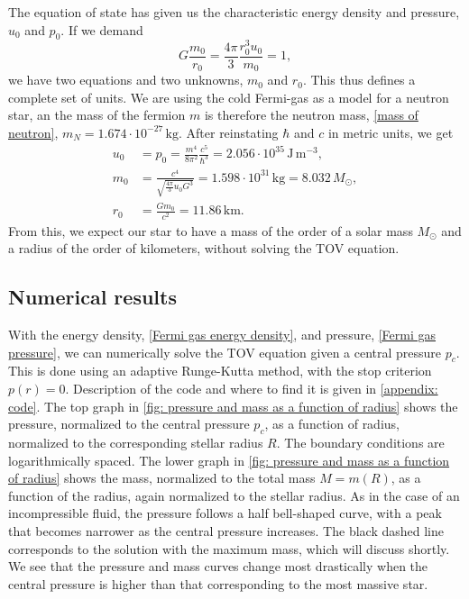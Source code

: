 The equation of state has given us the characteristic energy density and pressure, $u_0$ and $p_0$. 
If we demand
%
\begin{equation}
    G \frac{m_0}{r_0} = \frac{4 \pi }{3}\frac{r_0^3 u_0}{m_0} = 1,
\end{equation}
%
we have two equations and two unknowns, $m_0$ and $r_0$.
This thus defines a complete set of units.
We are using the cold Fermi-gas as a model for a neutron star, an the mass of the fermion $m$ is therefore the neutron mass, \autoref{mass of neutron}, $m_N = 1.674 \cdot 10^{-27} \, \text{kg}$.
After reinstating $\hbar$ and $c$ in metric units, we get
%
\begin{align}
    u_0 &= p_0 = \frac{m^4}{8 \pi^2}\frac{c^5}{\hbar^3} 
    = 2.056\cdot10^{35}  \, \text{J}\,\text{m}^{-3}, \\
    m_0 &= \frac{c^4}{\sqrt{\frac{4 \pi}{3} u_0 G^3} }
    = 1.598 \cdot 10^{31} \, \text{kg}
    = 8.032 \, M_\odot, \\
    r_0 &= \frac{G m_0}{c^2} = 11.86 \, \text{km}. %
\end{align}
%
From this, we expect our star to have a mass of the order of a solar mass $M_\odot$ and a radius of the order of kilometers, without solving the TOV equation.




\subsection{Numerical results}



With the energy density, \autoref{Fermi gas energy density}, and pressure, \autoref{Fermi gas pressure}, we can numerically solve the TOV equation given a central pressure $p_c$. 
This is done using an adaptive Runge-Kutta method, with the stop criterion $p(r) = 0$.
Description of the code and where to find it is given in \autoref{appendix: code}.
The top graph in \autoref{fig: pressure and mass as a function of radius} shows the pressure, normalized to the central pressure $p_c$, as a function of radius, normalized to the corresponding stellar radius $R$.
The boundary conditions are logarithmically spaced.
The lower graph in \autoref{fig: pressure and mass as a function of radius} shows the mass, normalized to the total mass $M = m(R)$, as a function of the radius, again normalized to the stellar radius.
As in the case of an incompressible fluid, the pressure follows a half bell-shaped curve, with a peak that becomes narrower as the central pressure increases.
The black dashed line corresponds to the solution with the maximum mass, which will discuss shortly.
We see that the pressure and mass curves change most drastically when the central pressure is higher than that corresponding to the most massive star.

